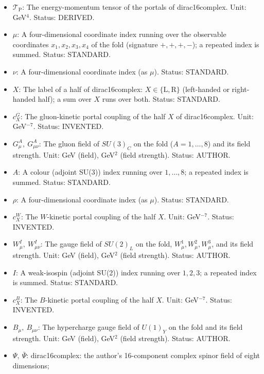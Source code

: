\documentclass[
  10pt,
]{article}
\providecommand{\tightlist}{%
  \setlength{\itemsep}{0pt}\setlength{\parskip}{0pt}}
\begin{document}
\begin{itemize}
\tightlist
\item
  \(\mathcal{T}_{\mathrm{P}}\): The energy-momentum tensor of the
  portals of dirac16complex. Unit: GeV\(^4\). Status: DERIVED.
\item
  \(\mu\): A four-dimensional coordinate index running over the
  observable coordinates \(x_1, x_2, x_3, x_4\) of the fold (signature
  \(+,+,+,-\)); a repeated index is summed. Status: STANDARD.
\item
  \(\nu\): A four-dimensional coordinate index (as \(\mu\)). Status:
  STANDARD.
\item
  \(X\): The label of a half of dirac16complex:
  \(X \in \{\mathrm{L}, \mathrm{R}\}\) (left-handed or right-handed
  half); a sum over \(X\) runs over both. Status: STANDARD.
\item
  \(c^{G}_X\): The gluon-kinetic portal coupling of the half \(X\) of
  dirac16complex. Unit: GeV\(^{-7}\). Status: INVENTED.
\item
  \(G^A_\mu,\ G^A_{\mu\nu}\): The gluon field of \(SU(3)_C\) on the fold
  (\(A = 1, \dots, 8\)) and its field strength. Unit: GeV (field),
  GeV\(^2\) (field strength). Status: AUTHOR.
\item
  \(A\): A colour (adjoint SU(3)) index running over \(1, \dots, 8\); a
  repeated index is summed. Status: STANDARD.
\item
  \(\rho\): A four-dimensional coordinate index (as \(\mu\)). Status:
  STANDARD.
\item
  \(c^{W}_X\): The \(W\)-kinetic portal coupling of the half \(X\).
  Unit: GeV\(^{-7}\). Status: INVENTED.
\item
  \(W^I_\mu,\ W^I_{\mu\nu}\): The gauge field of \(SU(2)_L\) on the
  fold, \(W^1_\mu, W^2_\mu, W^3_\mu\), and its field strength. Unit: GeV
  (field), GeV\(^2\) (field strength). Status: AUTHOR.
\item
  \(I\): A weak-isospin (adjoint SU(2)) index running over \(1, 2, 3\);
  a repeated index is summed. Status: STANDARD.
\item
  \(c^{B}_X\): The \(B\)-kinetic portal coupling of the half \(X\).
  Unit: GeV\(^{-7}\). Status: INVENTED.
\item
  \(B_\mu,\ B_{\mu\nu}\): The hypercharge gauge field of \(U(1)_Y\) on
  the fold and its field strength. Unit: GeV (field), GeV\(^2\) (field
  strength). Status: AUTHOR.
\item
  \(\Psi,\ \bar\Psi\): dirac16complex: the author's 16-component complex
  spinor field of eight dimensions;

\end{itemize}
\end{document}
